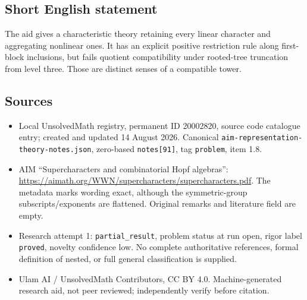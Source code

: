 \documentclass[11pt]{article}
\begin{document}
\subsection{Short English statement}
The aid gives a characteristic theory retaining every linear character and aggregating nonlinear ones. It has an explicit positive restriction rule along first-block inclusions, but fails quotient compatibility under rooted-tree truncation from level three. Those are distinct senses of a compatible tower.
\subsection{Sources}
\begin{itemize}
\item Local UnsolvedMath registry, permanent ID 20002820, source code catalogue entry; created and updated 14 August 2026. Canonical \texttt{aim-representation-theory-notes.json}, zero-based \texttt{notes[91]}, tag \texttt{problem}, item 1.8.
\item AIM ``Supercharacters and combinatorial Hopf algebras'': \url{https://aimath.org/WWN/supercharacters/supercharacters.pdf}. The metadata marks wording exact, although the symmetric-group subscripts/exponents are flattened. Original remarks and literature field are empty.
\item Research attempt 1: \texttt{partial\_result}, problem status at run open, rigor label \texttt{proved}, novelty confidence low. No complete authoritative references, formal definition of nested, or full general classification is supplied.
\item Ulam AI / UnsolvedMath Contributors, CC BY 4.0. Machine-generated research aid, not peer reviewed; independently verify before citation.
\end{itemize}
\end{document}
